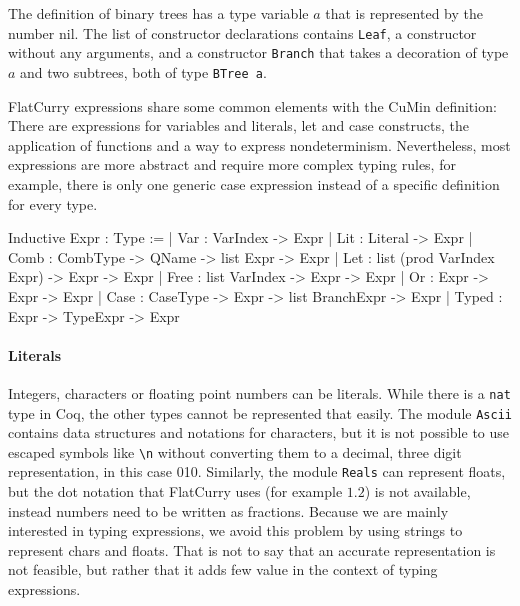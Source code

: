 \documentclass[paper = a4, fleqn, abstract=on, twoside]{scrreprt}
\begin{document}
The definition of binary trees has a type variable $a$ that is represented by the number nil. The list of constructor declarations contains \texttt{Leaf}, a constructor without any arguments, and a constructor \texttt{Branch} that takes a decoration of type $a$ and two subtrees, both of type \texttt{BTree a}.\\
\par
FlatCurry expressions share some common elements with the CuMin definition: There are expressions for variables and literals, let and case constructs, the application of functions and a way to express nondeterminism. Nevertheless, most expressions are more abstract and require more complex typing rules, for example, there is only one generic case expression instead of a specific definition for every type.
\begin{coqcode}
Inductive Expr : Type := 
  | Var   : VarIndex -> Expr
  | Lit   : Literal -> Expr
  | Comb  : CombType -> QName -> list Expr -> Expr
  | Let   : list (prod VarIndex Expr) -> Expr -> Expr
  | Free  : list VarIndex -> Expr -> Expr
  | Or    : Expr -> Expr -> Expr
  | Case  : CaseType -> Expr -> list BranchExpr -> Expr
  | Typed : Expr -> TypeExpr -> Expr
\end{coqcode}
\paragraph{Literals}
Integers, characters or floating point numbers can be literals. While there is a \texttt{nat} type in Coq, the other types cannot be represented that easily. The module \texttt{Ascii} contains data structures and notations for characters, but it is not possible to use escaped symbols like \texttt{\textbackslash n} without converting them to a decimal, three digit representation, in this case 010. Similarly, the module \texttt{Reals} can represent floats, but the dot notation that FlatCurry uses (for example $1.2$) is not available, instead numbers need to be written as fractions. Because we are mainly interested in typing expressions, we avoid this problem by using strings to represent chars and floats. That is not to say that an accurate representation is not feasible, but rather that it adds few value in the context of typing expressions. 
\end{document}

